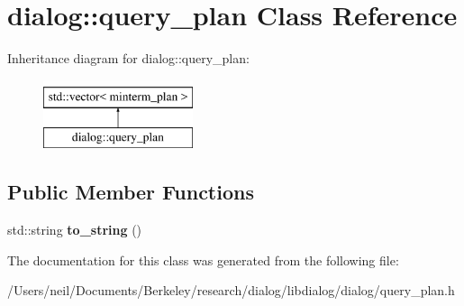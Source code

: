 \hypertarget{classdialog_1_1query__plan}{}\section{dialog\+:\+:query\+\_\+plan Class Reference}
\label{classdialog_1_1query__plan}
Inheritance diagram for dialog\+:\+:query\+\_\+plan\+:\begin{figure}[H]
\begin{center}
\leavevmode
\includegraphics[height=2.000000cm]{classdialog_1_1query__plan}
\end{center}
\end{figure}
\subsection*{Public Member Functions}
\begin{DoxyCompactItemize}
\item 
\mbox{\label{classdialog_1_1query__plan_ad7507d3597cd206396da2355e43a747f}} 
std\+::string {\bfseries to\+\_\+string} ()
\end{DoxyCompactItemize}


The documentation for this class was generated from the following file\+:\begin{DoxyCompactItemize}
\item 
/\+Users/neil/\+Documents/\+Berkeley/research/dialog/libdialog/dialog/query\+\_\+plan.\+h\end{DoxyCompactItemize}

